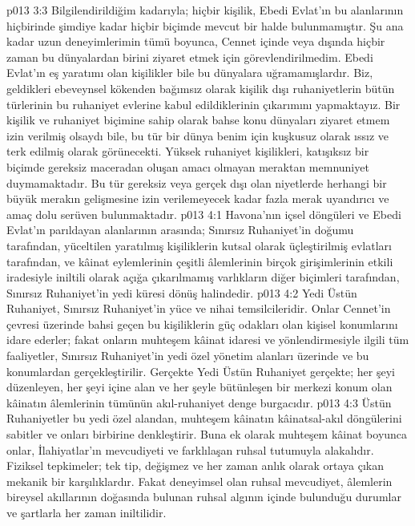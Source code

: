 \vs p013 3:3 Bilgilendirildiğim kadarıyla; hiçbir kişilik, Ebedi Evlat’ın bu alanlarının hiçbirinde şimdiye kadar hiçbir biçimde mevcut bir halde bulunmamıştır. Şu ana kadar uzun deneyimlerimin tümü boyunca, Cennet içinde veya dışında hiçbir zaman bu dünyalardan birini ziyaret etmek için görevlendirilmedim. Ebedi Evlat’ın eş yaratımı olan kişilikler bile bu dünyalara uğramamışlardır. Biz, geldikleri ebeveynsel kökenden bağımsız olarak kişilik dışı ruhaniyetlerin bütün türlerinin bu ruhaniyet evlerine kabul edildiklerinin çıkarımını yapmaktayız. Bir kişilik ve ruhaniyet biçimine sahip olarak bahse konu dünyaları ziyaret etmem izin verilmiş olsaydı bile, bu tür bir dünya benim için kuşkusuz olarak ıssız ve terk edilmiş olarak görünecekti. Yüksek ruhaniyet kişilikleri, katışıksız bir biçimde gereksiz maceradan oluşan amacı olmayan meraktan memnuniyet duymamaktadır. Bu tür gereksiz veya gerçek dışı olan niyetlerde herhangi bir büyük merakın gelişmesine izin verilemeyecek kadar fazla merak uyandırıcı ve amaç dolu serüven bulunmaktadır.
\vs p013 4:1 Havona’nın içsel döngüleri ve Ebedi Evlat’ın parıldayan alanlarının arasında; Sınırsız Ruhaniyet’in doğumu tarafından, yüceltilen yaratılmış kişiliklerin kutsal olarak üçleştirilmiş evlatları tarafından, ve kâinat eylemlerinin çeşitli âlemlerinin birçok girişimlerinin etkili iradesiyle iniltili olarak açığa çıkarılmamış varlıkların diğer biçimleri tarafından, Sınırsız Ruhaniyet’in yedi küresi dönüş halindedir.
\vs p013 4:2 Yedi Üstün Ruhaniyet, Sınırsız Ruhaniyet’in yüce ve nihai temsilcileridir. Onlar Cennet’in çevresi üzerinde bahsi geçen bu kişiliklerin güç odakları olan kişisel konumlarını idare ederler; fakat onların muhteşem kâinat idaresi ve yönlendirmesiyle ilgili tüm faaliyetler, Sınırsız Ruhaniyet’in yedi özel yönetim alanları üzerinde ve bu konumlardan gerçekleştirilir. Gerçekte Yedi Üstün Ruhaniyet gerçekte; her şeyi düzenleyen, her şeyi içine alan ve her şeyle bütünleşen bir merkezi konum olan kâinatın âlemlerinin tümünün akıl\hyp{}ruhaniyet denge burgacıdır.
\vs p013 4:3 Üstün Ruhaniyetler bu yedi özel alandan, muhteşem kâinatın kâinatsal\hyp{}akıl döngülerini sabitler ve onları birbirine denkleştirir. Buna ek olarak muhteşem kâinat boyunca onlar, İlahiyatlar’ın mevcudiyeti ve farklılaşan ruhsal tutumuyla alakalıdır. Fiziksel tepkimeler; tek tip, değişmez ve her zaman anlık olarak ortaya çıkan mekanik bir karşılıklardır. Fakat deneyimsel olan ruhsal mevcudiyet, âlemlerin bireysel akıllarının doğasında bulunan ruhsal algının içinde bulunduğu durumlar ve şartlarla her zaman iniltilidir.

